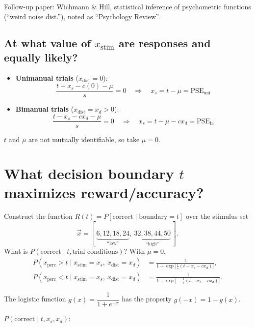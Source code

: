 \documentclass[11pt]{article}
\newcommand{\xs}{x_{\text{stim}}}
\newcommand{\xd}{x_{\text{dist}}}
\newcommand{\xp}{x_{\text{perc}}}
\newcommand{\PSEuni}{\mathrm{PSE}_{\text{uni}}}
\newcommand{\PSEbi}{\mathrm{PSE}_{\text{bi}}}
\newcommand{\high}{\text{``high''}}
\newcommand{\low}{\text{``low''}}
\begin{document}
\begin{aside}
Follow-up paper: Wichmann \& Hill, statistical inference of psychometric functions
(``weird noise dist.''), noted as ``Psychology Review''.
\end{aside}

\subsection*{At what value of $\xs$ are responses \high{} and \low{} equally likely?}

\begin{itemize}
  \item \textbf{Unimanual trials} ($\xd = 0$):
  \[
    \frac{t - x_s - c(0) - \mu}{s} = 0
    \quad\Longrightarrow\quad
    \boxed{x_s = t-\mu = \PSEuni}
  \]
  \item \textbf{Bimanual trials} ($\xd = x_d > 0$):
  \[
    \frac{t - x_s - c x_d - \mu}{s} = 0
    \quad\Longrightarrow\quad
    \boxed{x_s = t-\mu-c x_d = \PSEbi}
  \]
\end{itemize}

\begin{aside}
$t$ and $\mu$ are not mutually identifiable, so take $\mu = 0$.
\end{aside}

\section{What decision boundary $t$ maximizes reward/accuracy?}

Construct the function $R(t) = P[\text{correct} \mid \text{boundary} = t]$ over the
stimulus set
\[
  \vec{x} = [\,\underbrace{6,12,18,24}_{\text{``low''}},\ \underbrace{32,38,44,50}_{\text{``high''}}\,].
\]
What is $P(\text{correct} \mid t, \text{trial conditions})$? With $\mu = 0$,
\begin{align*}
  P(\xp > t \mid \xs = x_s,\ \xd = x_d) &= \frac{1}{1+\exp\bigl[\tfrac{1}{s}(t-x_s-c x_d)\bigr]},\\
  P(\xp < t \mid \xs = x_s,\ \xd = x_d) &= \frac{1}{1+\exp\bigl[-\tfrac{1}{s}(t-x_s-c x_d)\bigr]}.
\end{align*}
\begin{aside}
The logistic function $g(x) = \dfrac{1}{1+e^{-x}}$ has the property $g(-x) = 1-g(x)$.
\end{aside}

\noindent $P(\text{correct}\mid t, x_s, x_d)$:
\end{document}
